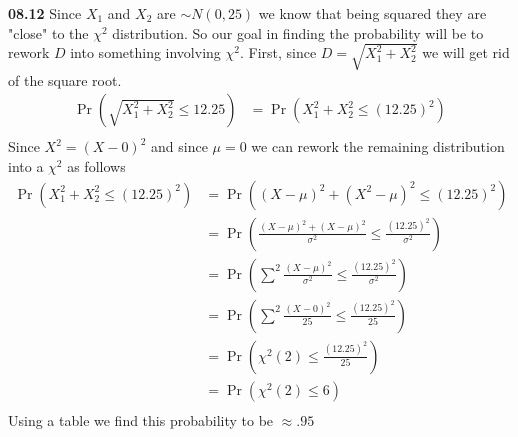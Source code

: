 

{\bf 08.12} Since $X_1$ and $X_2$ are $\sim N(0,25)$ we know that being squared they are "close" to the $\chi^2$
distribution. So our goal in finding the probability will be to rework $D$ into something involving $\chi^2$.
First, since $D = \sqrt{X^2_1 + X^2_2}$ we will get rid of the square root. \\
\begin{align*}
	\Pr \left( \sqrt{X^2_1 + X^2_2} \leq 12.25 \right) & = 	\Pr \left( X^2_1 + X^2_2 \leq (12.25)^2 \right) \\
\end{align*}
Since $X^2 = (X - 0)^2$ and since $\mu = 0$ we can rework the remaining distribution into a $\chi^2$ as follows
\begin{align*}
	\Pr \left( X^2_1 + X^2_2 \leq (12.25)^2 \right) & = \Pr \left( (X - \mu)^2  + (X^2- \mu)^2 \leq (12.25)^2  \right) \\
	& = \Pr \left( \frac{(X - \mu)^2  + (X- \mu)^2}{\sigma^2} \leq \frac{(12.25)^2 }{\sigma^2} \right) \\
	& = \Pr \left( \sum^{2}\frac{(X - \mu)^2}{\sigma^2} \leq \frac{(12.25)^2 }{\sigma^2} \right) \\
	& = \Pr \left( \sum^{2}\frac{(X - 0)^2}{25} \leq \frac{(12.25)^2 }{25} \right) \\
	& = \Pr \left( \chi^2 (2) \leq \frac{(12.25)^2}{25} \right) \\
	& = \Pr \left( \chi^2 (2) \leq  6 \right) \\
\end{align*}
Using a table we find this probability to be $\approx .95$
\\

